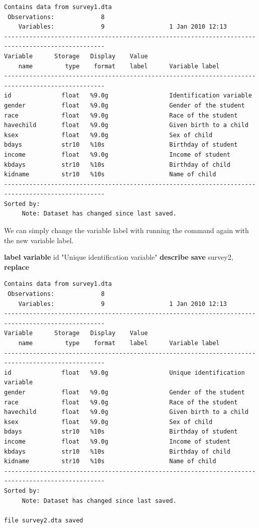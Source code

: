 \documentclass[
]{book}
\newenvironment{Shaded}{\begin{snugshade}}{\end{snugshade}}
\newcommand{\KeywordTok}[1]{\textcolor[rgb]{0.13,0.29,0.53}{\textbf{#1}}}
\newcommand{\NormalTok}[1]{#1}
\newcommand{\StringTok}[1]{\textcolor[rgb]{0.31,0.60,0.02}{#1}}
\begin{document}
\begin{verbatim}
Contains data from survey1.dta
 Observations:             8                  
    Variables:             9                  1 Jan 2010 12:13
--------------------------------------------------------------------------------------------------
Variable      Storage   Display    Value
    name         type    format    label      Variable label
--------------------------------------------------------------------------------------------------
id              float   %9.0g                 Identification variable
gender          float   %9.0g                 Gender of the student
race            float   %9.0g                 Race of the student
havechild       float   %9.0g                 Given birth to a child
ksex            float   %9.0g                 Sex of child
bdays           str10   %10s                  Birthday of student
income          float   %9.0g                 Income of student
kbdays          str10   %10s                  Birthday of child
kidname         str10   %10s                  Name of child
--------------------------------------------------------------------------------------------------
Sorted by: 
     Note: Dataset has changed since last saved.
\end{verbatim}

We can simply change the variable label with running the command again with the new variable label.

\begin{Shaded}
\begin{Highlighting}[]
\KeywordTok{label} \KeywordTok{variable}\NormalTok{ id }\StringTok{"Unique identification variable"}
\KeywordTok{describe}
\KeywordTok{save}\NormalTok{ survey2, }\KeywordTok{replace}
\end{Highlighting}
\end{Shaded}

\begin{verbatim}
Contains data from survey1.dta
 Observations:             8                  
    Variables:             9                  1 Jan 2010 12:13
--------------------------------------------------------------------------------------------------
Variable      Storage   Display    Value
    name         type    format    label      Variable label
--------------------------------------------------------------------------------------------------
id              float   %9.0g                 Unique identification variable
gender          float   %9.0g                 Gender of the student
race            float   %9.0g                 Race of the student
havechild       float   %9.0g                 Given birth to a child
ksex            float   %9.0g                 Sex of child
bdays           str10   %10s                  Birthday of student
income          float   %9.0g                 Income of student
kbdays          str10   %10s                  Birthday of child
kidname         str10   %10s                  Name of child
--------------------------------------------------------------------------------------------------
Sorted by: 
     Note: Dataset has changed since last saved.

file survey2.dta saved
\end{verbatim}
\end{document}
